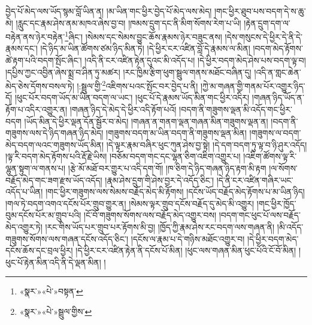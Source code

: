 བྱེད་པོ་མེད་ལས་ཡོད་སྙམ་བློ་ཡིན་ན། །མ་ཡིན་གང་ཕྱིར་བྱེད་པོ་མེད་ལས་མེད། །གང་ཕྱིར་ཐུབ་པས་བདག་དེ་ས་ཆུ་མེ། །རླུང་དང་རྣམ་ཤེས་ནམ་མཁའ་ཞེས་བྱ་བ། །ཁམས་དྲུག་དང་ནི་མིག་སོགས་རེག་པ་ཡི། །རྟེན་དྲུག་དག་ལ་བརྟེན་ནས་ཉེར་བརྟེན་\footnote{«སྣར་»«པེ་»བསྟན་}ཞིང་། །སེམས་དང་སེམས་བྱུང་ཆོས་རྣམས་ཉེར་བཟུང་ནས། །དེས་གསུངས་དེ་ཕྱིར་དེ་ནི་དེ་རྣམས་དང་། །དེ་ཉིད་མ་ཡིན་ཚོགས་ཙམ་ཉིད་མིན་ཏེ། །དེ་ཕྱིར་ངར་འཛིན་བློ་དེ་རྣམས་ལ་མིན། །བདག་མེད་རྟོགས་ཚེ་རྟག་པའི་བདག་སྤོང་ཞིང་། །འདི་ནི་ངར་འཛིན་རྟེན་དུའང་མི་འདོད་པ། །དེ་ཕྱིར་བདག་མེད་ཤེས་པས་བདག་ལྟ་བ། །དཔྱིས་ཀྱང་འབྱིན་ཞེས་སྨྲ་བ་ཤིན་ཏུ་མཚར། །རང་ཁྱིམ་རྩིག་ཕུག་སྦྲུལ་གནས་མཐོང་བཞིན་དུ། །འདི་ན་གླང་ཆེན་མེད་ཅེས་དོགས་བསལ་ཏེ། །:སྦྲུལ་གྱི་\footnote{«སྣར་»«པེ་»སྦྲུལ་གྱིས་}འཇིགས་པའང་སྤོང་བར་བྱེད་པ་ནི། །ཀྱེ་མ་གཞན་གྱི་གནམ་པོར་འགྱུར་ཉིད་དོ། །ཕུང་པོར་བདག་ཡོད་མ་ཡིན་བདག་ལ་ཡང་། །ཕུང་པོ་དེ་རྣམས་ཡོད་མིན་གང་ཕྱིར་འདིར། །གཞན་ཉིད་ཡོད་ན་རྟོག་པ་འདིར་འགྱུར་ན། །གཞན་ཉིད་དེ་མེད་དེ་ཕྱིར་འདི་རྟོག་པའོ། །བདག་ནི་གཟུགས་ལྡན་མི་འདོད་གང་ཕྱིར་བདག །ཡོད་མིན་དེ་ཕྱིར་ལྡན་དོན་སྦྱོར་བ་མེད། །གཞན་ན་གནག་ལྡན་གཞན་མིན་གཟུགས་ལྡན་ན། །བདག་ནི་གཟུགས་ལས་དེ་ཉིད་གཞན་ཉིད་མེད། །གཟུགས་བདག་མ་ཡིན་བདག་ནི་གཟུགས་ལྡན་མིན། །གཟུགས་ལ་བདག་མེད་བདག་ལའང་གཟུགས་ཡོད་མིན། །དེ་ལྟར་རྣམ་བཞིར་ཕུང་ཀུན་ཤེས་བྱ་སྟེ། །དེ་དག་བདག་ཏུ་ལྟ་བ་ཉི་ཤུར་འདོད། །ལྟ་རི་བདག་མེད་རྟོགས་པའི་རྡོ་རྗེ་ཡིས། །བཅོམ་བདག་གང་དང་ལྷན་ཅིག་འཇིག་འགྱུར་པ། །འཇིག་ཚོགས་ལྟ་རི་ལྷུན་སྟུག་ལ་གནས་པ། །རྩེ་མོ་མཐོ་བར་གྱུར་པ་འདི་དག་གོ། །ཁ་ཅིག་དེ་ཉིད་གཞན་ཉིད་རྟག་མི་རྟག །ལ་སོགས་བརྗོད་མེད་གང་ཟག་རྫས་ཡོད་འདོད། །རྣམ་ཤེས་དྲུག་གི་ཤེས་བྱར་དེ་འདོད་ཅིང་། །དེ་ནི་ངར་འཛིན་གཞིར་ཡང་འདོད་པ་ཡིན། །གང་ཕྱིར་གཟུགས་ལས་སེམས་བརྗོད་མེད་མི་རྟོགས། །དངོས་ཡོད་བརྗོད་མེད་རྟོགས་པ་མ་ཡིན་ཉིད། །གལ་ཏེ་བདག་འགའ་དངོས་པོར་གྲུབ་གྱུར་ན། །སེམས་ལྟར་གྲུབ་དངོས་བརྗོད་དུ་མེད་མི་འགྱུར། །གང་ཕྱིར་ཁྱོད་བུམ་དངོས་པོར་མ་གྲུབ་པའི། །ངོ་བོ་གཟུགས་སོགས་ལས་བརྗོད་མེད་འགྱུར་བས། །བདག་གང་ཕུང་པོ་ལས་བརྗོད་མེད་འགྱུར་ཏེ། །རང་གིས་ཡོད་པར་གྲུབ་པར་རྟོགས་མི་བྱ། །ཁྱོད་ཀྱི་རྣམ་ཤེས་རང་བདག་ལས་གཞན་ནི། །མི་འདོད་གཟུགས་སོགས་ལས་གཞན་དངོས་འདོད་ཅིང་། །དངོས་ལ་རྣམ་པ་དེ་གཉིས་མཐོང་འགྱུར་བ། །དེ་ཕྱིར་བདག་མེད་དངོས་ཆོས་དང་བྲལ་ཕྱིར། །དེ་ཕྱིར་ངར་འཛིན་རྟེན་ནི་དངོས་པོ་མིན། །ཕུང་ལས་གཞན་མིན་ཕུང་པོའི་ངོ་བོ་མིན། །ཕུང་པོ་རྟེན་མིན་འདི་ནི་དེ་ལྡན་མིན། །
